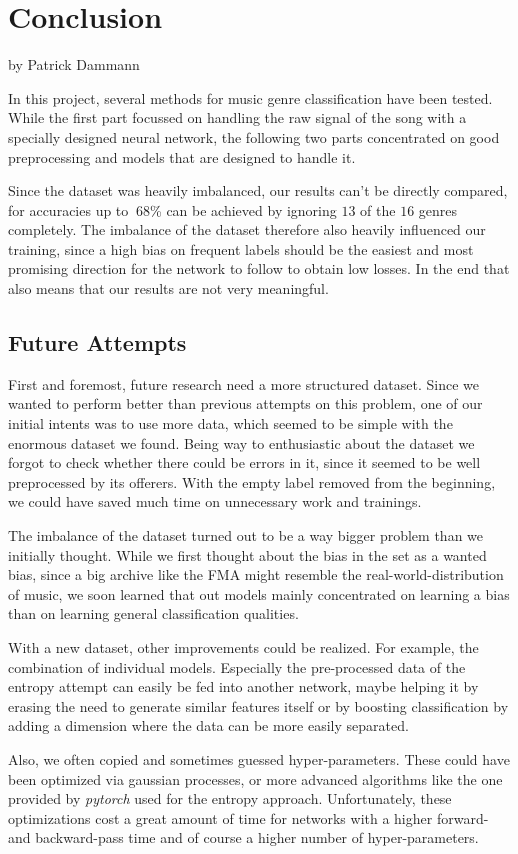 \chapter{Conclusion}
by Patrick Dammann

\bigskip

In this project, several methods for music genre classification have been tested. While the first part focussed on handling the raw signal of the song with a specially designed neural network, the following two parts concentrated on good preprocessing and models that are designed to handle it.

Since the dataset was heavily imbalanced, our results can't be directly compared, for accuracies up to $~68$\% can be achieved by ignoring $13$ of the $16$ genres completely. The imbalance of the dataset therefore also heavily influenced our training, since a high bias on frequent labels should be the easiest and most promising direction for the network to follow to obtain low losses. In the end that also means that our results are not very meaningful.

\section{Future Attempts}
First and foremost, future research need a more structured dataset. Since we wanted to perform better than previous attempts on this problem, one of our initial intents was to use more data, which seemed to be simple with the enormous dataset we found. Being way to enthusiastic about the dataset we forgot to check whether there could be errors in it, since it seemed to be well preprocessed by its offerers. With the empty label removed from the beginning, we could have saved much time on unnecessary work and trainings.

The imbalance of the dataset turned out to be a way bigger problem than we initially thought. While we first thought about the bias in the set as a wanted bias, since a big archive like the FMA might resemble the real-world-distribution of music, we soon learned that out models mainly concentrated on learning a bias than on learning general classification qualities.

With a new dataset, other improvements could be realized. For example, the combination of individual models. Especially the pre-processed data of the entropy attempt can easily be fed into another network, maybe helping it by erasing the need to generate similar features itself or by boosting classification by adding a dimension where the data can be more easily separated.

Also, we often copied and sometimes guessed hyper-parameters. These could have been optimized via gaussian processes, or more advanced algorithms like the one provided by \emph{pytorch} used for the entropy approach.
Unfortunately, these optimizations cost a great amount of time for networks with a higher forward- and backward-pass time and of course a higher number of hyper-parameters.